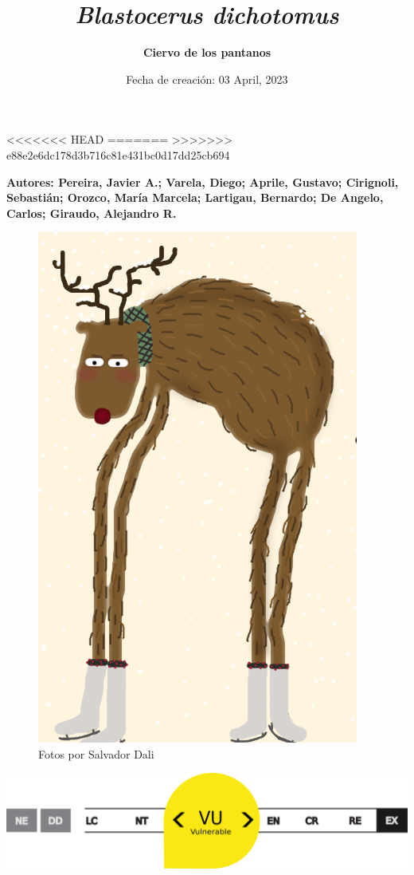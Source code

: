 \documentclass[
  x11names]{article}
\title{\emph{Blastocerus dichotomus}}
\subtitle{\textbf{Ciervo de los pantanos}}
\author{}
\date{\vspace{-2.5em}Fecha de creación: 03 April, 2023}
\begin{document}
\maketitle

\setmainfont{Calibri}
\setsansfont{Calibri}
\setmonofont{Calibri}

\newcommand\invisiblesection[1]{%
  \refstepcounter{section}%
  \addcontentsline{toc}{section}{\protect\numberline{\thesection}#1}%
  \sectionmark{#1}}


%
<<<<<<< HEAD
\vspace{-0.4cm}
=======
>>>>>>> e88e2e6dc178d3b716c81e431bc0d17dd25cb694

\center

\textbf{Autores: Pereira, Javier A.; Varela, Diego; Aprile, Gustavo;
Cirignoli, Sebastián; Orozco, María Marcela; Lartigau, Bernardo; De
Angelo, Carlos; Giraudo, Alejandro R.}

\begin{figure}[H]

{\centering \includegraphics[width=0.35\linewidth]{photos/Blastocerus dichotomus} 

}

\caption{Fotos por Salvador Dali}\label{fig:image}
\end{figure}

\begin{center}\includegraphics[width=0.7\linewidth]{images/scale-vu} \end{center}
\end{document}
